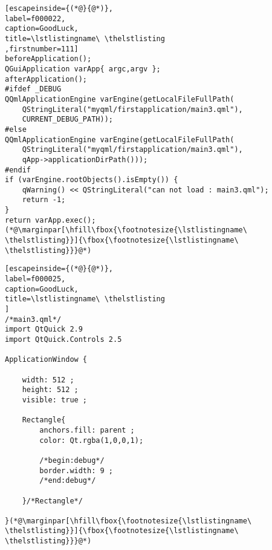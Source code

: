 \FloatBarrier
\begin{lstlisting}[escapeinside={(*@}{@*)},
label=f000022,
caption=GoodLuck,
title=\lstlistingname\ \thelstlisting
,firstnumber=111]
beforeApplication();
QGuiApplication varApp{ argc,argv };
afterApplication();
#ifdef _DEBUG
QQmlApplicationEngine varEngine(getLocalFileFullPath(
    QStringLiteral("myqml/firstapplication/main3.qml"),
    CURRENT_DEBUG_PATH));
#else
QQmlApplicationEngine varEngine(getLocalFileFullPath(
    QStringLiteral("myqml/firstapplication/main3.qml"),
    qApp->applicationDirPath()));
#endif
if (varEngine.rootObjects().isEmpty()) {
    qWarning() << QStringLiteral("can not load : main3.qml");
    return -1;
}
return varApp.exec();(*@\marginpar[\hfill\fbox{\footnotesize{\lstlistingname\ \thelstlisting}}]{\fbox{\footnotesize{\lstlistingname\ \thelstlisting}}}@*)\end{lstlisting}          %
\FloatBarrier
\begin{lstlisting}[escapeinside={(*@}{@*)},
label=f000025,
caption=GoodLuck,
title=\lstlistingname\ \thelstlisting
]
/*main3.qml*/
import QtQuick 2.9
import QtQuick.Controls 2.5

ApplicationWindow {

    width: 512 ;
    height: 512 ;
    visible: true ;

    Rectangle{
        anchors.fill: parent ;
        color: Qt.rgba(1,0,0,1);

        /*begin:debug*/
        border.width: 9 ;
        /*end:debug*/

    }/*Rectangle*/

}(*@\marginpar[\hfill\fbox{\footnotesize{\lstlistingname\ \thelstlisting}}]{\fbox{\footnotesize{\lstlistingname\ \thelstlisting}}}@*)\end{lstlisting}          %



































